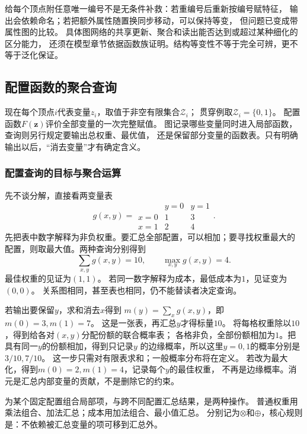 给每个顶点附任意唯一编号不是无条件补救：若重编号后重新按编号赋特征，
输出会依赖命名；若把额外属性随置换同步移动，可以保持等变，
但问题已变成带属性图的比较。
具体图网络的共享更新、聚合和读出能否达到或超过某种细化的区分能力，
还须在模型章节依据函数族证明。结构等变性不等于完全可辨，更不等于泛化保证。

\subsection{配置函数的聚合查询}
\label{sec:graph-theory-semiring-dynamic-programming}

现在每个顶点\(i\)代表变量\(z_i\)，取值于非空有限集合\(\mathcal Z_i\)；
贯穿例取\(\mathcal Z_i=\{0,1\}\)。
配置函数\(F(\bm z)\)评价全部变量的一次完整赋值。
图记录哪些变量同时进入局部函数，查询则另行规定要输出总权重、最优值，
还是保留部分变量的函数表。只有明确输出以后，“消去变量”才有确定含义。

\subsubsection{配置查询的目标与聚合运算}

先不谈分解，直接看两变量表
\[
  g(x,y)=
  \begin{array}{c|cc}
    &y=0&y=1\\ \hline
    x=0&1&3\\
    x=1&2&4
  \end{array}.
\]
先把表中数字解释为非负权重。要汇总全部配置，可以相加；要寻找权重最大的
配置，则取最大值。两种查询分别得到
\[
  \sum_{x,y}g(x,y)=10,\qquad \max_{x,y}g(x,y)=4.
\]
最佳权重的见证为\((1,1)\)。
若同一数字解释为成本，最低成本为\(1\)，见证变为\((0,0)\)。
关系图相同，甚至表也相同，仍不能替读者决定查询。

若输出要保留\(y\)，求和消去\(x\)得到
\(m(y)=\sum_xg(x,y)\)，即\(m(0)=3,m(1)=7\)。
这是一张表，再汇总\(y\)才得标量\(10\)。
将每格权重除以\(10\)，得到给各对\((x,y)\)分配份额的联合概率表；
各格非负，全部份额相加为\(1\)。把具有同一\(y\)的份额相加，得到只记录\(y\)
的边缘概率，所以这里\(y=0,1\)的概率分别是\(3/10,7/10\)。
这一步只需对有限表求和；一般概率分布将在定义。
若改为最大化，得到\(m(0)=2,m(1)=4\)，记录每个\(y\)的最佳权重，
不再是边缘概率。消元是汇总内部变量的贡献，不是删除它的约束。

为某个固定配置组合局部项，与跨不同配置汇总结果，是两种操作。
普通权重用乘法组合、加法汇总；成本用加法组合、最小值汇总。
分别记为\(\otimes\)和\(\oplus\)，核心规则是：不依赖被汇总变量的项可移到汇总外。

